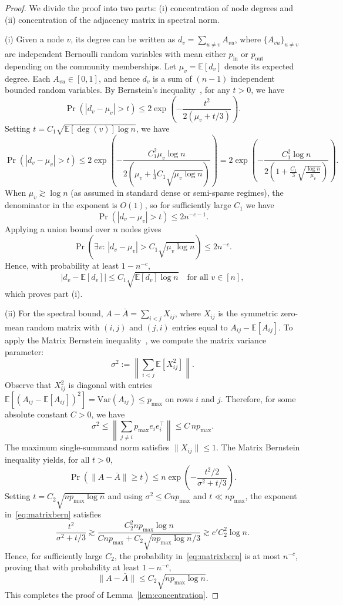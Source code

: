 \begin{proof}
We divide the proof into two parts: (i) concentration of node degrees and (ii) concentration of the adjacency matrix in spectral norm.

\noindent(i) Given a node $v$, its degree can be written as $d_v = \sum_{u\neq v} A_{vu}$, where $\{A_{vu}\}_{u\neq v}$ are independent Bernoulli random variables with mean either $p_{\mathrm{in}}$ or $p_{\mathrm{out}}$ depending on the community memberships. Let $\mu_v = \mathbb{E}[d_v]$ denote its expected degree. Each $A_{vu}\in[0,1]$, and hence $d_v$ is a sum of $(n-1)$ independent bounded random variables.
By Bernstein’s inequality~\parencite{govil1987bernstein}, for any $t>0$, we have
\[
    \Pr(|d_v - \mu_v| > t)
    \le 2\exp\!\left(-\frac{t^2}{2(\mu_v+t/3)}\right).
\]
Setting $t=C_1\sqrt{\mathbb{E}[ \deg(v) ]\log n}$, we have 
\[
    \Pr(|d_v - \mu_v| > t) \le 2\exp\!\left(-\frac{C_1^2 \mu_v \log n}{2(\mu_v + \tfrac{1}{3}C_1\sqrt{\mu_v\log n})} \right) =
    2\exp\!\left( -\frac{C_1^2\log n}{2(1 + \tfrac{C_1}{3}\sqrt{\tfrac{\log n}{\mu_v}})} \right).
\]
When $\mu_v \gtrsim \log n$ (as assumed in standard dense or semi-sparse regimes), the denominator in the exponent is $O(1)$, so for sufficiently large $C_1$ we have
\[
    \Pr(|d_v - \mu_v| > t) \le 2n^{-c-1}.
\]
\noindent Applying a union bound over $n$ nodes gives
\[
    \Pr\! \left(\exists v:\, |d_v - \mu_v| > C_1\sqrt{\mu_v\log n}\right) \le 2n^{-c}.
\]
Hence, with probability at least $1-n^{-c}$,
\[
    |d_v-\mathbb E[d_v]| \le C_1\sqrt{\mathbb E[d_v]\log n} \quad\text{for all }v\in[n],
\]
which proves part (i).



\noindent(ii) For the spectral bound, $A-\bar A=\sum_{i<j} X_{ij}$, where $X_{ij}$ is the symmetric zero-mean random matrix with $(i,j)$ and $(j,i)$ entries equal to $A_{ij}-\mathbb{E}[A_{ij}]$. To apply the Matrix Bernstein inequality~\parencite{tropp2012user}, we compute the matrix variance parameter:
\[
    \sigma^2 := \left\|\sum_{i<j}\mathbb E[X_{ij}^2]\right\|.
\]
Observe that $X_{ij}^2$ is diagonal with entries 
$\mathbb E[(A_{ij}-\mathbb E[A_{ij}])^2] = \mathrm{Var}(A_{ij}) \le p_{\max}$ 
on rows $i$ and $j$. Therefore, for some absolute constant $C>0$, we have
\[
    \sigma^2 \le \left\| \sum_{j\neq i} p_{\max} e_i e_i^\top \right\| \le  C\,n p_{\max}.
\] 
The maximum single-summand norm satisfies $\|X_{ij}\|\le 1$.  The Matrix Bernstein inequality yields, for all $t>0$,
\begin{equation}
    \Pr(\|A-\bar A\| \ge t) \le  n \exp\!\left(-\frac{t^2/2}{\sigma^2 + t/3} \right).
    \label{eq:matrixbern}
\end{equation}
Setting $t = C_2\sqrt{n p_{\max}\log n} $ and using $\sigma^2 \le C n p_{\max}$ and $t\ll n p_{\max}$, the exponent in~\eqref{eq:matrixbern} satisfies
\[
\frac{t^2}{\sigma^2 + t/3}
\gtrsim
\frac{C_2^2 n p_{\max} \log n}{C n p_{\max} + C_2\sqrt{n p_{\max}\log n}/3}
\gtrsim c' C_2^2 \log n.
\]
Hence, for sufficiently large $C_2$, the probability in~\eqref{eq:matrixbern} is at most $n^{-c}$, proving that with probability at least $1-n^{-c}$,
\[
\|A-\bar A\| \le C_2\sqrt{n p_{\max}\log n}.
\]\noindent 
This completes the proof of Lemma~\ref{lem:concentration}.
\end{proof}
